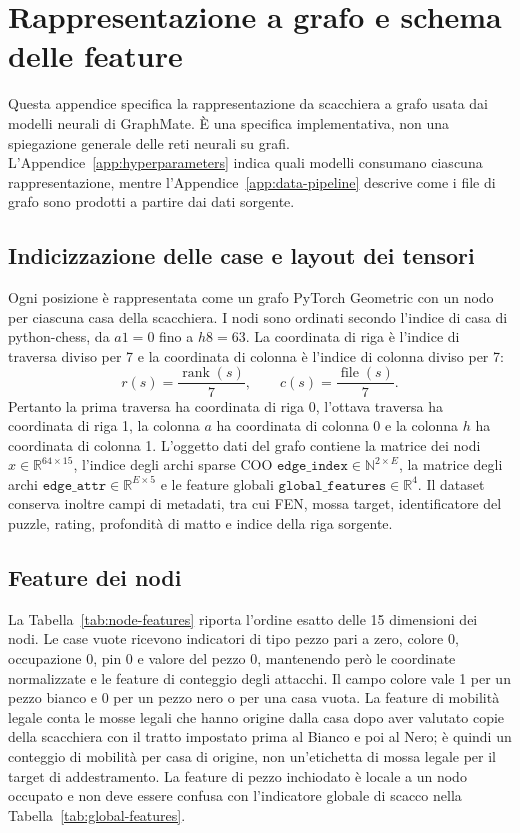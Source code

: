 \chapter{Rappresentazione a grafo e schema delle feature}
\label{app:graph-features}

Questa appendice specifica la rappresentazione da scacchiera a grafo usata dai modelli neurali di GraphMate.  È una specifica implementativa, non una spiegazione generale delle reti neurali su grafi.  L'Appendice~\ref{app:hyperparameters} indica quali modelli consumano ciascuna rappresentazione, mentre l'Appendice~\ref{app:data-pipeline} descrive come i file di grafo sono prodotti a partire dai dati sorgente.

\section{Indicizzazione delle case e layout dei tensori}
\label{app:graph-features:indexing}

Ogni posizione è rappresentata come un grafo PyTorch Geometric con un nodo per ciascuna casa della scacchiera.  I nodi sono ordinati secondo l'indice di casa di python-chess, da \(a1=0\) fino a \(h8=63\).  La coordinata di riga è l'indice di traversa diviso per 7 e la coordinata di colonna è l'indice di colonna diviso per 7:
\[
r(s)=\frac{\operatorname{rank}(s)}{7}, \qquad c(s)=\frac{\operatorname{file}(s)}{7}.
\]
Pertanto la prima traversa ha coordinata di riga 0, l'ottava traversa ha coordinata di riga 1, la colonna \(a\) ha coordinata di colonna 0 e la colonna \(h\) ha coordinata di colonna 1.  L'oggetto dati del grafo contiene la matrice dei nodi \(x\in\mathbb{R}^{64\times15}\), l'indice degli archi sparse COO \(\texttt{edge\_index}\in\mathbb{N}^{2\times E}\), la matrice degli archi \(\texttt{edge\_attr}\in\mathbb{R}^{E\times5}\) e le feature globali \(\texttt{global\_features}\in\mathbb{R}^{4}\).  Il dataset conserva inoltre campi di metadati, tra cui FEN, mossa target, identificatore del puzzle, rating, profondità di matto e indice della riga sorgente.



\section{Feature dei nodi}
\label{app:graph-features:nodes}

La Tabella~\ref{tab:node-features} riporta l'ordine esatto delle 15 dimensioni dei nodi.  Le case vuote ricevono indicatori di tipo pezzo pari a zero, colore 0, occupazione 0, pin 0 e valore del pezzo 0, mantenendo però le coordinate normalizzate e le feature di conteggio degli attacchi.  Il campo colore vale 1 per un pezzo bianco e 0 per un pezzo nero o per una casa vuota.  La feature di mobilità legale conta le mosse legali che hanno origine dalla casa dopo aver valutato copie della scacchiera con il tratto impostato prima al Bianco e poi al Nero; è quindi un conteggio di mobilità per casa di origine, non un'etichetta di mossa legale per il target di addestramento.  La feature di pezzo inchiodato è locale a un nodo occupato e non deve essere confusa con l'indicatore globale di scacco nella Tabella~\ref{tab:global-features}.

